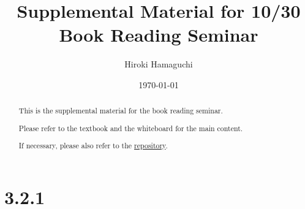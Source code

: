 \documentclass[a4paper, 14pt, dvipdfmx]{extarticle}
\begin{document}
\title{Supplemental Material for 10/30\\Book Reading Seminar}
\author{Hiroki Hamaguchi}
\date{\today}
\maketitle

\begin{abstract}
    \begin{center}
        This is the supplemental material for the book reading seminar.

        Please refer to the textbook and the whiteboard for the main content.

        If necessary, please also refer to the \href{https://github.com/hari64boli64/BookReadingSeminarMaterials}{repository}.
    \end{center}
\end{abstract}

\section*{3.2.1}
\end{document}
